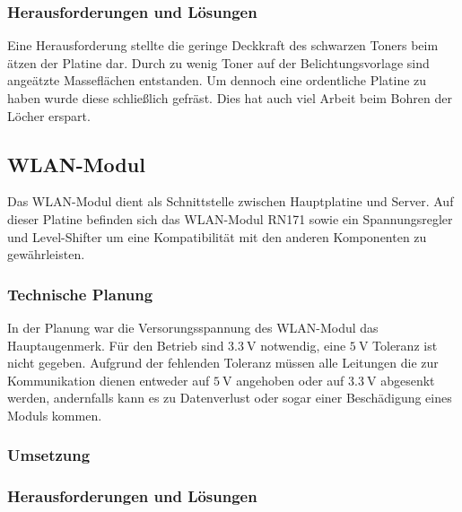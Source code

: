     \subsubsection{Herausforderungen und Lösungen}
    Eine Herausforderung stellte die geringe Deckkraft des schwarzen Toners beim ätzen der Platine dar. Durch zu wenig Toner auf der Belichtungsvorlage sind
    angeätzte Masseflächen entstanden. Um dennoch eine ordentliche Platine zu haben wurde diese schließlich gefräst. Dies hat auch viel Arbeit beim Bohren der
    Löcher erspart.

  \subsection{WLAN-Modul}
  Das WLAN-Modul dient als Schnittstelle zwischen Hauptplatine und Server. Auf dieser Platine befinden sich das WLAN-Modul RN171 sowie ein Spannungsregler und Level-Shifter
  um eine Kompatibilität mit den anderen Komponenten zu gewährleisten.

    \subsubsection{Technische Planung}
    In der Planung war die Versorungsspannung des WLAN-Modul das Hauptaugenmerk. Für den Betrieb sind $\SI{3.3}{\volt}$ notwendig, eine $\SI{5}{\volt}$ Toleranz ist nicht gegeben.
    Aufgrund der fehlenden Toleranz müssen alle Leitungen die zur Kommunikation dienen entweder auf $\SI{5}{\volt}$ angehoben oder auf $\SI{3.3}{\volt}$ abgesenkt werden,
    andernfalls kann es zu Datenverlust oder sogar einer Beschädigung eines Moduls kommen.

    \subsubsection{Umsetzung}

    \subsubsection{Herausforderungen und Lösungen}
